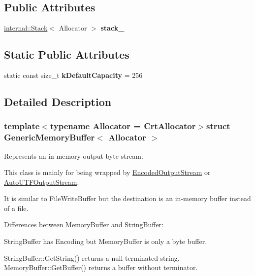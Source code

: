 \subsection*{Public Attributes}
\begin{DoxyCompactItemize}
\item 
\hypertarget{struct_generic_memory_buffer_a977b479180bebe8ae14ca1c11d52a486}{}\hyperlink{classinternal_1_1_stack}{internal\+::\+Stack}$<$ Allocator $>$ {\bfseries stack\+\_\+}\label{struct_generic_memory_buffer_a977b479180bebe8ae14ca1c11d52a486}

\end{DoxyCompactItemize}
\subsection*{Static Public Attributes}
\begin{DoxyCompactItemize}
\item 
\hypertarget{struct_generic_memory_buffer_af6ecdbdbb8d3aa53cdef6e788e4980be}{}static const size\+\_\+t {\bfseries k\+Default\+Capacity} = 256\label{struct_generic_memory_buffer_af6ecdbdbb8d3aa53cdef6e788e4980be}

\end{DoxyCompactItemize}


\subsection{Detailed Description}
\subsubsection*{template$<$typename Allocator = Crt\+Allocator$>$struct Generic\+Memory\+Buffer$<$ Allocator $>$}

Represents an in-\/memory output byte stream. 

This class is mainly for being wrapped by \hyperlink{class_encoded_output_stream}{Encoded\+Output\+Stream} or \hyperlink{class_auto_u_t_f_output_stream}{Auto\+U\+T\+F\+Output\+Stream}.

It is similar to File\+Write\+Buffer but the destination is an in-\/memory buffer instead of a file.

Differences between Memory\+Buffer and String\+Buffer\+:
\begin{DoxyEnumerate}
\item String\+Buffer has Encoding but Memory\+Buffer is only a byte buffer.
\item String\+Buffer\+::\+Get\+String() returns a null-\/terminated string. Memory\+Buffer\+::\+Get\+Buffer() returns a buffer without terminator.
\end{DoxyEnumerate}



